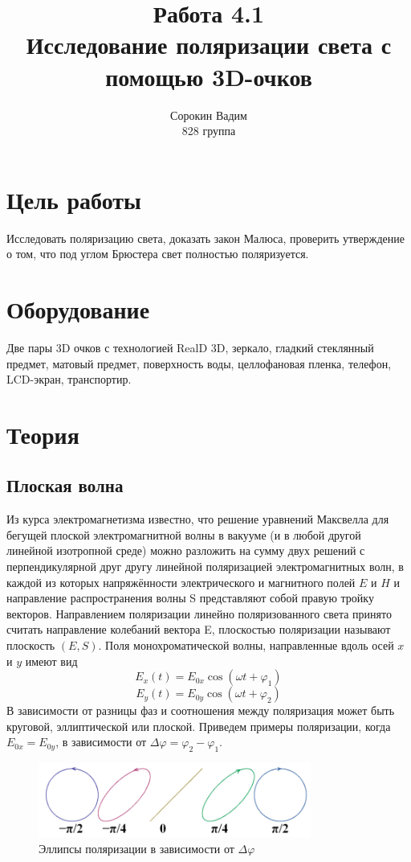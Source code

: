 \documentclass[a4paper, 12pt]{article}%
\author{Сорокин Вадим\\
828 группа}
\title{\textbf{Работа 4.1\\
Исследование поляризации света с помощью 3D-очков}}
\begin{document}
\maketitle
\section*{Цель работы}
Исследовать поляризацию света, доказать закон Малюса, проверить утверждение о том, что под углом Брюстера свет полностью поляризуется.
\section*{Оборудование}
Две пары 3D очков с технологией RealD 3D, зеркало, гладкий стеклянный предмет, матовый предмет, поверхность воды, целлофановая пленка, телефон, LCD-экран, транспортир.
\section*{Теория}
\subsection*{Плоская волна}
Из курса электромагнетизма известно, что решение уравнений Максвелла для
бегущей плоской электромагнитной волны в вакууме (и в любой другой линейной
изотропной среде) можно разложить на сумму двух решений с перпендикулярной друг другу линейной поляризацией электромагнитных волн, в каждой из которых
напряжённости электрического и магнитного полей $E$ и $H$ и направление распространения волны S представляют собой правую тройку векторов. Направлением поляризации линейно поляризованного света принято считать направление колебаний вектора E, плоскостью поляризации называют плоскость $(E, S)$.
Поля монохроматической волны, направленные вдоль осей $x$ и $y$ имеют вид
\[E_x(t) =E_{0x} \cos(\omega t + \varphi_1)\]
\[E_y(t) =E_{0y} \cos(\omega t + \varphi_2)\]
В зависимости от разницы фаз и соотношения между поляризация может быть круговой, эллиптической или плоской. Приведем примеры поляризации, когда $E_{0x} = E_{0y}$, в зависимости от $\Delta \varphi = \varphi_2 - \varphi_1$.

\begin{figure}[h]
\begin{center}
\includegraphics[width = 0.8\textwidth]{1.png}
\caption{Эллипсы поляризации в зависимости от $\Delta \varphi$}
\end{center}
\end{figure}
\end{document}

